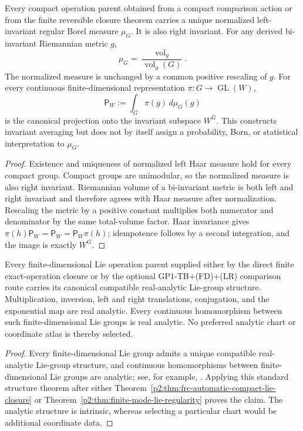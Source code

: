 \documentclass[11pt,a4paper]{article}
\begin{document}
\begin{theorem}
\label{p2:thm:unique-haar-averaging}
Every compact operation parent obtained from a compact comparison action or
from the finite reversible closure theorem carries a unique normalized
left-invariant regular Borel measure \(\mu_G\).  It is also right invariant.
For any derived bi-invariant Riemannian metric \(g\),
\[
 \mu_G
 =\frac{\operatorname{vol}_g}{\operatorname{vol}_g(G)}.
\]
The normalized measure is unchanged by a common positive rescaling of \(g\).
For every continuous finite-dimensional representation
\(\pi:G\to\operatorname{GL}(W)\),
\[
 \mathsf P_W:=\int_G\pi(g)\,d\mu_G(g)
\]
is the canonical projection onto the invariant subspace \(W^G\).  This
constructs invariant averaging but does not by itself assign a probability,
Born, or statistical interpretation to \(\mu_G\).
\end{theorem}

\begin{proof}
Existence and uniqueness of normalized left Haar measure hold for every
compact group.  Compact groups are unimodular, so the normalized measure is
also right invariant.  Riemannian volume of a bi-invariant metric is both left
and right invariant and therefore agrees with Haar measure after
normalization.  Rescaling the metric by a positive constant multiplies both
numerator and denominator by the same total-volume factor.  Haar invariance
gives \(\pi(h)\mathsf P_W=\mathsf P_W=\mathsf P_W\pi(h)\); idempotence follows
by a second integration, and the image is exactly \(W^G\).
\end{proof}

\begin{theorem}
\label{p2:thm:derived-real-analyticity}
Every finite-dimensional Lie operation parent supplied either by the direct
finite exact-operation closure or by the optional GP1-TB+(FD)+(LR) comparison
route carries its canonical
compatible real-analytic Lie-group structure.  Multiplication, inversion,
left and right translations, conjugation, and the exponential map are real
analytic.  Every continuous homomorphism between such
finite-dimensional Lie groups is real analytic.  No preferred analytic chart
or coordinate atlas is thereby selected.
\end{theorem}

\begin{proof}
Every finite-dimensional Lie group admits a unique compatible real-analytic
Lie-group structure, and continuous homomorphisms between finite-dimensional
Lie groups are analytic; see, for example, \cite{Hall2015lie}.  Applying this
standard structure theorem after either
Theorem~\ref{p2:thm:frc-automatic-compact-lie-closure} or
Theorem~\ref{p2:thm:finite-mode-lie-regularity} proves the claim.  The
analytic structure is intrinsic, whereas selecting a particular chart would
be additional coordinate data.
\end{proof}
\end{document}
